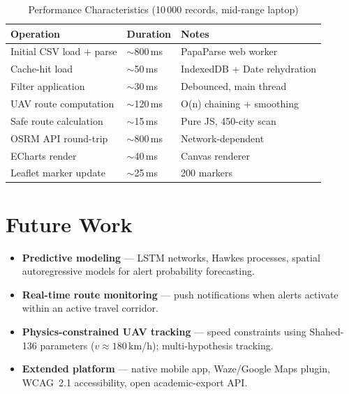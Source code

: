 \documentclass[12pt,a4paper]{article}
\begin{document}
\begin{table}[H]\centering
\caption{Performance Characteristics (10\,000 records, mid-range laptop)}
\begin{tabular}{lll}\toprule
\textbf{Operation} & \textbf{Duration} & \textbf{Notes} \\\midrule
Initial CSV load + parse & $\sim$800\,ms & PapaParse web worker \\
Cache-hit load           & $\sim$50\,ms  & IndexedDB + Date rehydration \\
Filter application       & $\sim$30\,ms  & Debounced, main thread \\
UAV route computation    & $\sim$120\,ms & O(n) chaining + smoothing \\
Safe route calculation   & $\sim$15\,ms  & Pure JS, 450-city scan \\
OSRM API round-trip      & $\sim$800\,ms & Network-dependent \\
ECharts render           & $\sim$40\,ms  & Canvas renderer \\
Leaflet marker update    & $\sim$25\,ms  & 200 markers \\\bottomrule
\end{tabular}
\end{table}

\section{Future Work}
\label{sec:future}

\begin{itemize}
  \item \textbf{Predictive modeling} --- LSTM networks, Hawkes processes, spatial
        autoregressive models for alert probability forecasting.
  \item \textbf{Real-time route monitoring} --- push notifications when alerts
        activate within an active travel corridor.
  \item \textbf{Physics-constrained UAV tracking} --- speed constraints using
        Shahed-136 parameters ($v\approx180$\,km/h); multi-hypothesis tracking.
  \item \textbf{Extended platform} --- native mobile app, Waze/Google Maps plugin,
        WCAG~2.1 accessibility, open academic-export API.
\end{itemize}
\end{document}
